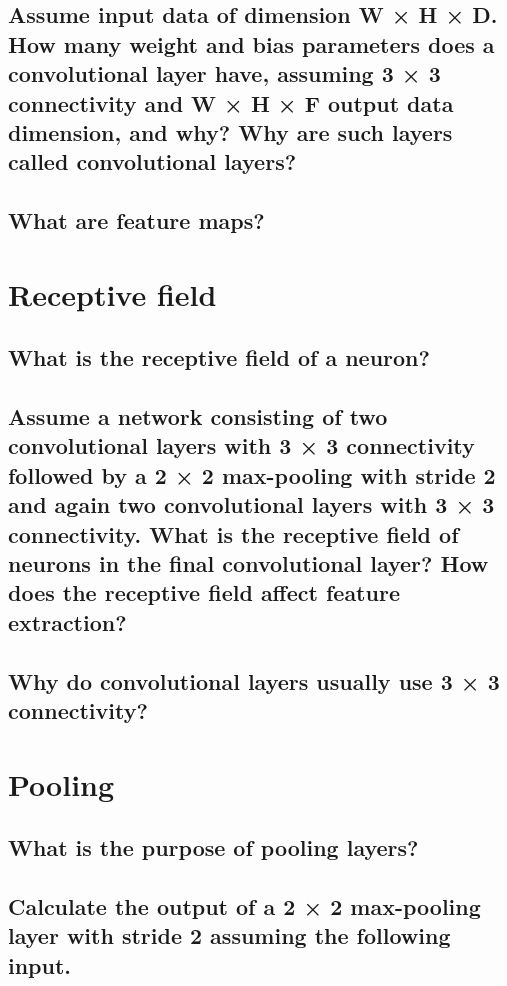 \subsection{Assume input data of dimension W × H × D. How many weight and bias parameters does a convolutional layer have, assuming 3 × 3 connectivity and W × H × F output data dimension, and why? Why are such layers called convolutional layers?}

\subsection{What are feature maps?}

\section{Receptive field}

\subsection{What is the receptive field of a neuron?}

\subsection{Assume a network consisting of two convolutional layers with 3 × 3 connectivity followed by a 2 × 2 max-pooling with stride 2 and again two convolutional layers with 3 × 3 connectivity. What is the receptive field of neurons in the final convolutional layer? How does the receptive field affect feature extraction? }

\subsection{Why do convolutional layers usually use 3 × 3 connectivity?}

\section{Pooling}

\subsection{What is the purpose of pooling layers?}

\subsection{Calculate the output of a 2 × 2 max-pooling layer with stride 2 assuming the following input.}

